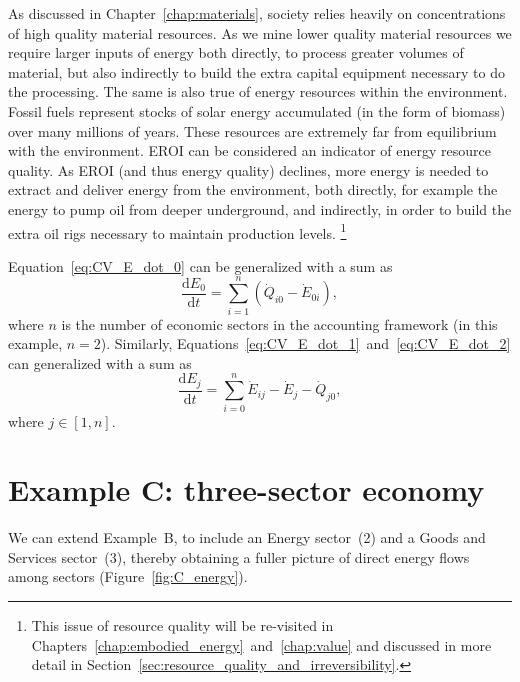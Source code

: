 As discussed in Chapter~\ref{chap:materials},
society relies heavily on concentrations of high quality
material resources.
As we mine lower quality material resources we require
larger inputs of energy both directly,
to process greater volumes of material,
but also indirectly to build the extra capital equipment
necessary to do the processing.
The same is also true of energy resources within the environment.
Fossil fuels represent stocks of solar energy
accumulated (in the form of biomass)
over many millions of years.
These resources are extremely far from equilibrium with the environment.
EROI can be considered an indicator of energy resource quality.
As EROI (and thus energy quality) declines,
more energy is needed to extract and deliver energy from the environment,
both directly, for example the energy to pump oil from deeper underground,
and indirectly, in order to build the extra oil rigs necessary to 
maintain production levels.%
	\footnote{
	This issue 
	of resource quality will be re-visited in 
	Chapters~\ref{chap:embodied_energy}~and~\ref{chap:value}
	and discussed in more
	detail in Section~\ref{sec:resource_quality_and_irreversibility}.
	}

Equation~\ref{eq:CV_E_dot_0} can be generalized with a sum as
%
\begin{equation} \label{eq:CV_E_biosphere_general}
	\frac{\mathrm{d}E_{0}}{\mathrm{d}t} 
	= \sum\limits_{i=1}^n \left( \dot{Q}_{i0} - \dot{E}_{0i} \right),
\end{equation}
%
where $n$ is the number of economic sectors in the accounting framework
(in this example, $n = 2$).
Similarly, Equations~\ref{eq:CV_E_dot_1}~and~\ref{eq:CV_E_dot_2} 
can generalized with a sum as
%
\begin{equation} \label{eq:B-CV_E_econ_general}
	\frac{\mathrm{d}E_{j}}{\mathrm{d}t} 
	= \sum\limits_{i=0}^n\dot{E}_{ij} 
	- \dot{E}_{j}  
	- \dot{Q}_{j0},
\end{equation}
%
where $j \in [1, n]$.


\section{Example C: three-sector economy} %
\label{sec:C_energy}

We can extend Example~B, to include an Energy sector~(2) 
and a Goods and Services sector~(3), thereby obtaining
a fuller picture of direct energy flows among sectors
(Figure~\ref{fig:C_energy}).

